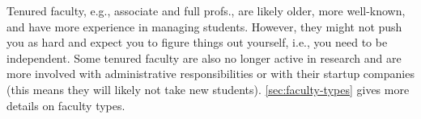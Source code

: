 \documentclass[oneside,11pt,dvipsnames]{book}
\newenvironment{commentbox}[1][]{
  \small
  \begin{mybox}
    {\small \textbf{#1}}
  }{
  \end{mybox}
}
\begin{document}
Tenured faculty, e.g., associate and full profs., are likely older, more well-known, and have more experience in managing students.  However, they might not push you as hard and expect you to figure things out yourself, i.e., you need to be independent.  Some tenured faculty are also no longer active in research and are more involved with administrative responsibilities or with their startup companies (this means they will likely not take new students). \autoref{sec:faculty-types} gives more details on faculty types.




\end{document}
